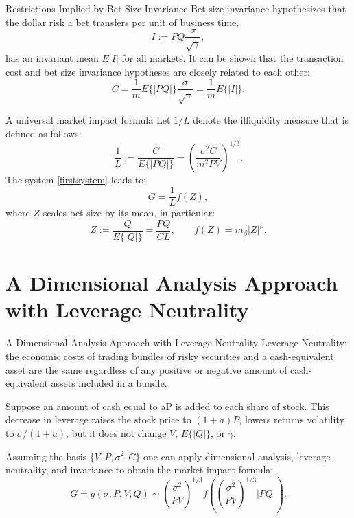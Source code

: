 \documentclass[aspectratio=169]{beamer}
\begin{document}
\begin{frame}{Restrictions Implied by Bet Size Invariance}
    Bet size invariance hypothesizes that the dollar risk a bet
    transfers per unit of business time,
    \begin{equation*}
        I := P Q \frac{\sigma}{\sqrt{\gamma}},
    \end{equation*}
    has an invariant mean $E{|I|}$ for all markets. It can be shown that the transaction cost and bet size invariance hypotheses are closely
    related to each other:
    \begin{equation*}
        C = \frac{1}{m} E\{|P Q|\} \frac{\sigma}{\sqrt{\gamma}} = \frac{1}{m} E\{|I|\}.
    \end{equation*}

\end{frame}

\begin{frame}{A universal market impact formula}
    Let $1/L$ denote the illiquidity measure that is defined as follows:
    \begin{equation*}
        \frac{1}{L} := \frac{C}{E\{|P Q|\}} = \left( \frac{\sigma^2 C}{m^2 P V} \right) ^{1/3}.
    \end{equation*}
    The system \ref{firstsystem} leads to:
    \begin{equation*}
        G = \frac{1}{L} f(Z),
    \end{equation*}
    where $Z$ scales bet size by its mean, in particular:
    \begin{equation*}
        Z := \frac{Q}{E\{|Q|\}} = \frac{P Q}{C L}, \; \; \; \; \; \; \; f(Z) = m_\beta |Z|^\beta .
    \end{equation*}
\end{frame}

\section{A Dimensional Analysis Approach with Leverage Neutrality}

\begin{frame}{A Dimensional Analysis Approach with Leverage Neutrality}
    Leverage Neutrality: the economic costs of trading bundles of risky securities and a cash-equivalent asset are the same
    regardless of any positive or negative amount of cash-equivalent assets included in a bundle.
    \begin{example}
        Suppose an amount of cash equal to aP is added to each share of stock. This decrease in leverage raises the stock price
        to $(1 + a)P$, lowers returns volatility to $\sigma/(1 + a)$, but it does not change $V$, $E\{|Q|\}$, or $\gamma$.
    \end{example}
    Assuming the basis
    $\{V, P, \sigma^2, C\}$ one can apply dimensional analysis, leverage neutrality, and invariance to obtain the market impact formula:
    \begin{equation*}
        G = g(\sigma, P, V; Q) \sim \left( \frac{\sigma^2}{PV}\right) ^{1/3} f\left( \left( \frac{\sigma^2}{PV}\right) ^{1/3} |PQ| \right).
    \end{equation*}

\end{frame}
\end{document}

